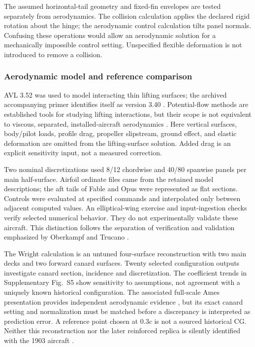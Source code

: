 \documentclass[10pt,letterpaper]{article}
\begin{document}
The assumed horizontal-tail geometry and fixed-fin envelopes are tested separately from aerodynamics. The collision calculation applies the declared rigid rotation about the hinge; the aerodynamic control calculation tilts panel normals. Confusing these operations would allow an aerodynamic solution for a mechanically impossible control setting. Unspecified flexible deformation is not introduced to remove a collision.

\subsubsection{Aerodynamic model and reference comparison}
AVL 3.52 was used to model interacting thin lifting surfaces; the archived accompanying primer identifies itself as version 3.40 \cite{ref20}. Potential-flow methods are established tools for studying lifting interactions, but their scope is not equivalent to viscous, separated, installed-aircraft aerodynamics \cite{ref21,ref22}. Here vertical surfaces, body/pilot loads, profile drag, propeller slipstream, ground effect, and elastic deformation are omitted from the lifting-surface solution. Added drag is an explicit sensitivity input, not a measured correction.

Two nominal discretizations used 8/12 chordwise and 40/80 spanwise panels per main half-surface. Airfoil ordinate files came from the retained model descriptions; the aft tails of Fable and Opus were represented as flat sections. Controls were evaluated at specified commands and interpolated only between adjacent computed values. An elliptical-wing exercise and input-ingestion checks verify selected numerical behavior. They do not experimentally validate these aircraft. This distinction follows the separation of verification and validation emphasized by Oberkampf and Trucano \cite{ref24}.

The Wright calculation is an untuned four-surface reconstruction with two main decks and two forward canard surfaces. Twenty selected configuration outputs investigate canard section, incidence and discretization. The coefficient trends in Supplementary Fig.~S5 show sensitivity to assumptions, not agreement with a uniquely known historical configuration. The associated full-scale Ames presentation provides independent aerodynamic evidence \cite{ref13}, but its exact canard setting and normalization must be matched before a discrepancy is interpreted as prediction error. A reference point chosen at $0.3c$ is not a sourced historical CG. Neither this reconstruction nor the later reinforced replica is silently identified with the 1903 aircraft \cite{ref12}.
\end{document}
